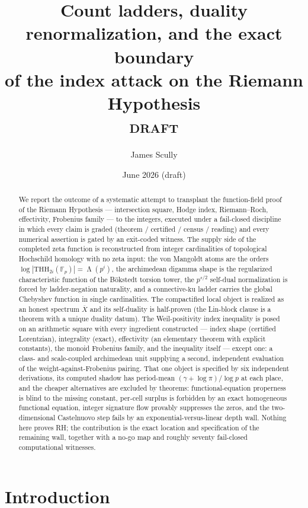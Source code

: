 \documentclass[11pt,reqno]{amsart}
\title[Count ladders and the boundary of the index attack]{Count ladders, duality
renormalization, and the exact boundary\\ of the index attack on the Riemann Hypothesis\\
{\normalsize\textsc{draft}}}
\author{James Scully}
\date{June 2026 (draft)}
\theoremstyle{plain}
\theoremstyle{definition}
\theoremstyle{remark}
\newcommand{\F}{\mathbb{F}}
\newcommand{\THH}{\mathrm{THH}}
\newcommand{\ku}{\mathrm{ku}}
\newcommand{\Xbar}{\overline{X}}
\DeclareMathOperator{\Lam}{\Lambda}
\begin{document}
\begin{abstract}
We report the outcome of a systematic attempt to transplant the function-field proof of the
Riemann Hypothesis --- intersection square, Hodge index, Riemann--Roch, effectivity, Frobenius
family --- to the integers, executed under a fail-closed discipline in which every claim is
graded (theorem / certified / census / reading) and every numerical assertion is gated by an
exit-coded witness. The supply side of the completed zeta function is reconstructed from
integer cardinalities of topological Hochschild homology with no zeta input: the von Mangoldt
atoms are the orders $\log|\THH_{2i}(\F_p)|=\Lam(p^i)$, the archimedean digamma shape is the
regularized characteristic function of the B\"okstedt torsion tower, the $p^{s/2}$ self-dual
normalization is forced by ladder-negation naturality, and a connective-$\ku$ ladder carries
the global Chebyshev function in single cardinalities. The compactified local object is
realized as an honest spectrum $\Xbar$ and its self-duality is half-proven (the Lin-block
clause is a theorem with a unique duality datum). The Weil-positivity index inequality is
posed on an arithmetic square with every ingredient constructed --- index shape (certified
Lorentzian), integrality (exact), effectivity (an elementary theorem with explicit constants),
the monoid Frobenius family, and the inequality itself --- except one: a class- and
scale-coupled archimedean unit supplying a second, independent evaluation of the
weight-against-Frobenius pairing. That one object is specified by six independent derivations,
its computed shadow has period-mean $(\gamma+\log\pi)/\log p$ at each place, and the
cheaper alternatives
are excluded by theorems: functional-equation properness is blind to the missing constant,
per-cell surplus is forbidden by an exact homogeneous functional equation, integer signature
flow provably suppresses the zeros, and the two-dimensional Castelnuovo step fails by an
exponential-versus-linear depth wall. Nothing here proves RH; the contribution is the exact
location and specification of the remaining wall, together with a no-go map and roughly
seventy fail-closed computational witnesses.
\end{abstract}

\maketitle
\tableofcontents

\section{Introduction}\label{sec:intro}
\end{document}
